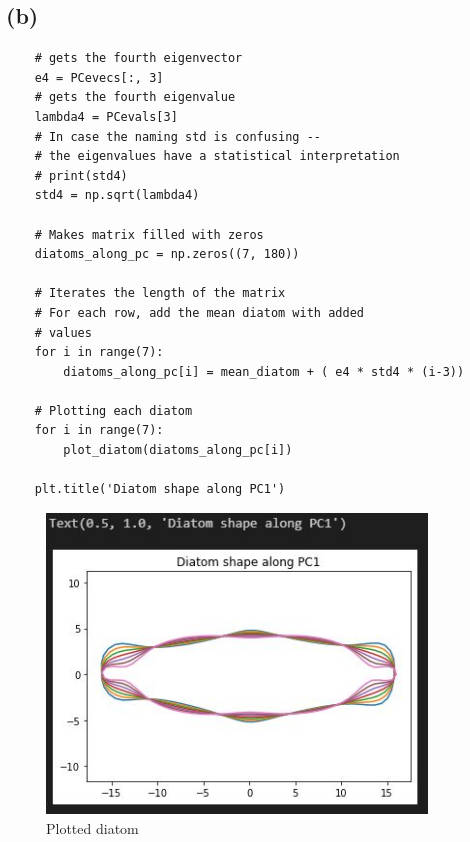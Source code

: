 \subsection{(b)}

\begin{verbatim}
    # gets the fourth eigenvector
    e4 = PCevecs[:, 3] 
    # gets the fourth eigenvalue
    lambda4 = PCevals[3] 
    # In case the naming std is confusing -- 
    # the eigenvalues have a statistical interpretation
    # print(std4)
    std4 = np.sqrt(lambda4) 

    # Makes matrix filled with zeros
    diatoms_along_pc = np.zeros((7, 180))

    # Iterates the length of the matrix
    # For each row, add the mean diatom with added
    # values
    for i in range(7):
        diatoms_along_pc[i] = mean_diatom + ( e4 * std4 * (i-3))
        
    # Plotting each diatom
    for i in range(7):
        plot_diatom(diatoms_along_pc[i])

    plt.title('Diatom shape along PC1')
\end{verbatim}

\begin{figure}[H]
    \centering
    \includegraphics[width=0.9\textwidth]{Figures/Result_of_diatoms.JPG}
    \caption{Plotted diatom}
\end{figure}